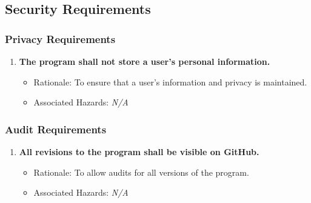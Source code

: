 \documentclass{article}
\begin{document}
\subsection{Security Requirements}
\subsubsection{Privacy Requirements}
\begin{enumerate}[{PR}1. ]
\item \label{PR1} \textbf{The program shall not store a user's personal information.}
    \begin{itemize} 
        \item Rationale: To ensure that a user's information and privacy is maintained.
        \item Associated Hazards: \textit{N/A}
    \end{itemize} 
\end{enumerate}

\subsubsection{Audit Requirements}
\begin{enumerate}[{AR}1. ]
\item \label{AR1}\textbf{All revisions to the program shall be visible on GitHub.}
    \begin{itemize} 
        \item Rationale: To allow audits for all versions of the program.
         \item Associated Hazards: \textit{N/A}
    \end{itemize} 
\end{enumerate}
\end{document}
